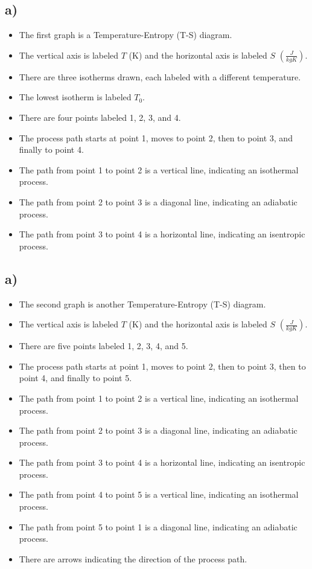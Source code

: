 

\subsection*{a)}

\begin{itemize}
    \item The first graph is a Temperature-Entropy (T-S) diagram.
    \item The vertical axis is labeled \( T \) (K) and the horizontal axis is labeled \( S \) \(\left(\frac{J}{kgK}\right)\).
    \item There are three isotherms drawn, each labeled with a different temperature.
    \item The lowest isotherm is labeled \( T_0 \).
    \item There are four points labeled 1, 2, 3, and 4.
    \item The process path starts at point 1, moves to point 2, then to point 3, and finally to point 4.
    \item The path from point 1 to point 2 is a vertical line, indicating an isothermal process.
    \item The path from point 2 to point 3 is a diagonal line, indicating an adiabatic process.
    \item The path from point 3 to point 4 is a horizontal line, indicating an isentropic process.
\end{itemize}



\subsection*{a)}

\begin{itemize}
    \item The second graph is another Temperature-Entropy (T-S) diagram.
    \item The vertical axis is labeled \( T \) (K) and the horizontal axis is labeled \( S \) \(\left(\frac{J}{kgK}\right)\).
    \item There are five points labeled 1, 2, 3, 4, and 5.
    \item The process path starts at point 1, moves to point 2, then to point 3, then to point 4, and finally to point 5.
    \item The path from point 1 to point 2 is a vertical line, indicating an isothermal process.
    \item The path from point 2 to point 3 is a diagonal line, indicating an adiabatic process.
    \item The path from point 3 to point 4 is a horizontal line, indicating an isentropic process.
    \item The path from point 4 to point 5 is a vertical line, indicating an isothermal process.
    \item The path from point 5 to point 1 is a diagonal line, indicating an adiabatic process.
    \item There are arrows indicating the direction of the process path.
\end{itemize}